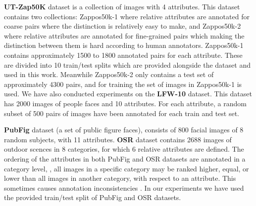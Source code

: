 \textbf{UT-Zap50K} \cite{Yu2014} dataset is a collection of images with 4 attributes. This dataset contains two collections: Zappos50k-1 where relative attributes are annotated for coarse pairs where the distinction is relatively easy to make, and Zappos50k-2 where relative attributes are annotated for fine-grained pairs which making the distinction between them is hard according to human annotators.
Zappos50k-1 contains approximately 1500 to 1800 annotated pairs for each attribute. These are divided into 10 train/test splits which are provided alongside the dataset and used in this work. Meanwhile Zappos50k-2 only contains a test set of approximately 4300 pairs, and for training the set of images in Zappos50k-1 is used.
We have also conducted experiments on the \textbf{LFW-10} \cite{Sandeep_2014_CVPR} dataset. This dataset has 2000 images of people faces and 10 attributes. For each attribute, a random subset of 500 pairs of images have been annotated for each train and test set.

\textbf{PubFig} \cite{parikh2011} dataset (a set of public figure faces), consists of 800 facial images of 8 random subjects, with 11 attributes.
\textbf{OSR} \cite{parikh2011} dataset contains 2688 images of outdoor scences in 8 categories, for which 6 relative attributes are defined.
The ordering of the attributes in both PubFig and OSR datasets are annotated in a category level, \ie, all images in a specific category may be ranked higher, equal, or lower than all images in another category, with respect to an attribute. This sometimes causes annotation inconsistencies \cite{Sandeep_2014_CVPR}.
In our experiments we have used the provided train/test split of PubFig and OSR datasets.


